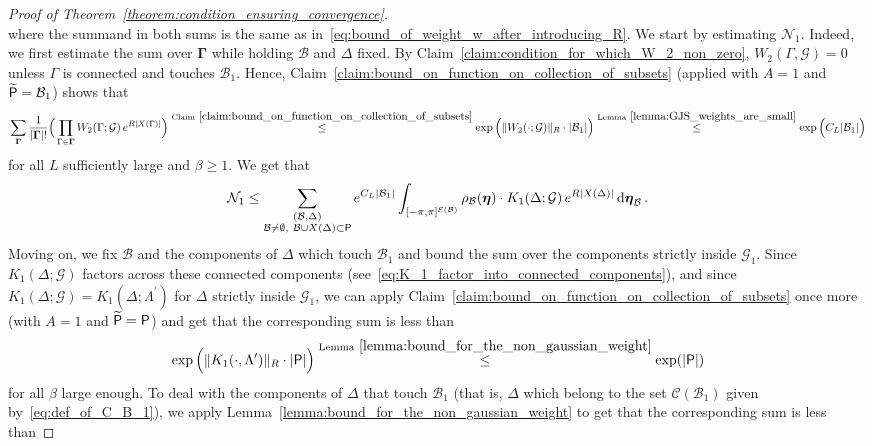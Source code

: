 \documentclass[11pt]{article}
\theoremstyle{definition}
\theoremstyle{remark}
\numberwithin{theorem}{section}
\def\La{{\Lambda}}
\def\Ga{{\Gamma}}
\newcommand{\cE}{\mathcal{E}}
\newcommand{\cB}{\mathcal B}
\begin{document}
\begin{proof}[Proof of Theorem~\ref{theorem:condition_ensuring_convergence}]
\begin{equation*}
    \end{equation*}
    where the summand in both sums is the same as in~\eqref{eq:bound_of_weight_w_after_introducing_R}. We start by estimating $\mathcal{N}_1$. Indeed, we first estimate the sum over $\boldsymbol{\Ga}$ while holding $\mathcal{B}$ and $\Delta$ fixed. By Claim~\ref{claim:condition_for_which_W_2_non_zero}, $W_2(\Ga,\mathcal{G}) = 0$ unless $\Ga$ is connected and touches $\mathcal{B}_1$. Hence, Claim~\ref{claim:bound_on_function_on_collection_of_subsets} (applied with $A=1$ and $\widetilde{{\sf P}} = \cB_1$) shows that
    \begin{equation*}
        \sum_{\boldsymbol{\Ga}} \frac{1}{|\boldsymbol{\Ga}|!} \Big(\prod_{\Ga\in \mathbf{\Ga}} W_2(\Ga;\mathcal{G}) \, e^{R|X(\Ga)|}\Big)  \stackrel{\text{Claim}~\ref{claim:bound_on_function_on_collection_of_subsets}}{ \le} \exp\Big( \| W_2(\cdot;\mathcal{G}) \|_R \cdot |\mathcal{B}_1|\Big) \stackrel{\text{Lemma}~\ref{lemma:GJS_weights_are_small}}{\le } \exp\Big(C_L |\mathcal{B}_1| \Big)
    \end{equation*}
    for all $L$ sufficiently large and $\beta \ge 1$. We get that
    \begin{equation} \label{eq:bound_on_weight_w_with_R_first}
        \mathcal{N}_1 \le \sum_{\substack{(\mathcal{B},\Delta) \\ \mathcal{B}\not=\emptyset , \ \mathcal{B} \cup X(\Delta) \subset {\sf P} }} e^{C_L|\mathcal{B}_1|} \int_{[-\pi,\pi]^{\cE(\mathcal{B})}} \rho_{\mathcal{B}}(\boldsymbol{\eta})   \cdot K_1(\Delta;\mathcal{G}) \,  e^{R|X(\Delta)|} \,  {\rm d}\boldsymbol{\eta}_{\mathcal{B}} \, .
    \end{equation}
    Moving on, we fix $\mathcal{B}$ and the components of $\Delta$ which touch $\mathcal{B}_1$ and bound the sum over the components strictly inside $\mathcal{G}_1$. Since $K_1(\Delta;\mathcal{G})$ factors across these connected components (see~\eqref{eq:K_1_factor_into_connected_components}), and since $K_1(\Delta;\mathcal{G}) = K_1(\Delta;\La^\prime)$ for $\Delta$ strictly inside $\mathcal{G}_1$,  we can apply Claim~\ref{claim:bound_on_function_on_collection_of_subsets} once more (with $A=1$ and $\widetilde {\sf P} = {\sf P}$) and get that the corresponding sum is less than
    \[
    \exp\Big(\| K_1( \cdot,\La^\prime) \|_{R} \cdot |{\sf P}| \Big) \stackrel{\text{Lemma}~\ref{lemma:bound_for_the_non_gaussian_weight}}{\le} \exp(|{\sf P}|)
    \]
    for all $\beta$ large enough. To deal with the components of $\Delta$ that touch $\mathcal{B}_1$ (that is, $\Delta$ which belong to the set $\mathcal{C}(\mathcal{B}_1)$ given by~\eqref{eq:def_of_C_B_1}), we apply Lemma~\ref{lemma:bound_for_the_non_gaussian_weight} to get that the corresponding sum is  less than

\end{proof}
\end{document}
